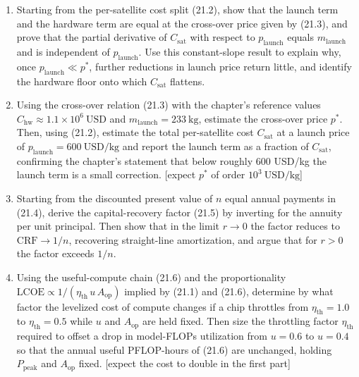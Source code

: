 \documentclass[
  11pt,
  openany,
  oneside]{book}
\begin{document}
\begin{enumerate}
\def\labelenumi{\arabic{enumi}.}
\item
  Starting from the per-satellite cost split (21.2), show that the
  launch term and the hardware term are equal at the cross-over price
  given by (21.3), and prove that the partial derivative of
  \(C_{\mathrm{sat}}\) with respect to \(p_{\mathrm{launch}}\) equals
  \(m_{\mathrm{launch}}\) and is independent of \(p_{\mathrm{launch}}\).
  Use this constant-slope result to explain why, once
  \(p_{\mathrm{launch}} \ll p^{*}\), further reductions in launch price
  return little, and identify the hardware floor onto which
  \(C_{\mathrm{sat}}\) flattens.
\item
  Using the cross-over relation (21.3) with the chapter's reference
  values \(C_{\mathrm{hw}} \approx 1.1\times 10^{6}\ \mathrm{USD}\) and
  \(m_{\mathrm{launch}} = 233\ \mathrm{kg}\), estimate the cross-over
  price \(p^{*}\). Then, using (21.2), estimate the total per-satellite
  cost \(C_{\mathrm{sat}}\) at a launch price of
  \(p_{\mathrm{launch}} = 600\ \mathrm{USD/kg}\) and report the launch
  term as a fraction of \(C_{\mathrm{sat}}\), confirming the chapter's
  statement that below roughly 600 USD/kg the launch term is a small
  correction. {[}expect \(p^{*}\) of order
  \(10^{3}\ \mathrm{USD/kg}\){]}
\item
  Starting from the discounted present value of \(n\) equal annual
  payments in (21.4), derive the capital-recovery factor (21.5) by
  inverting for the annuity per unit principal. Then show that in the
  limit \(r \to 0\) the factor reduces to \(\mathrm{CRF} \to 1/n\),
  recovering straight-line amortization, and argue that for \(r > 0\)
  the factor exceeds \(1/n\).
\item
  Using the useful-compute chain (21.6) and the proportionality
  \(\mathrm{LCOE} \propto 1/(\eta_{\mathrm{th}}\, u\, A_{\mathrm{op}})\)
  implied by (21.1) and (21.6), determine by what factor the levelized
  cost of compute changes if a chip throttles from
  \(\eta_{\mathrm{th}} = 1.0\) to \(\eta_{\mathrm{th}} = 0.5\) while
  \(u\) and \(A_{\mathrm{op}}\) are held fixed. Then size the throttling
  factor \(\eta_{\mathrm{th}}\) required to offset a drop in model-FLOPs
  utilization from \(u = 0.6\) to \(u = 0.4\) so that the annual useful
  PFLOP-hours of (21.6) are unchanged, holding \(P_{\mathrm{peak}}\) and
  \(A_{\mathrm{op}}\) fixed. {[}expect the cost to double in the first
  part{]}
\end{enumerate}
\end{document}
